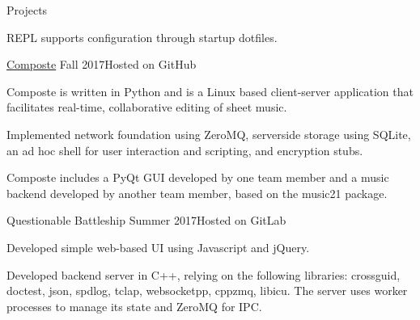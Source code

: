 \documentclass{resume} %
\begin{document}
\begin{rSection}{Projects}
\begin{rSubsection}
\item REPL supports configuration through startup dotfiles.

\end{rSubsection}

\begin{rSubsection}
    {\href{https://composte.me}{Composte}}
    {Fall 2017}{Hosted on GitHub}

\item Composte is written in Python and is a Linux based client-server
    application that facilitates real-time, collaborative editing of sheet
    music.

\item Implemented network foundation using ZeroMQ, serverside storage using
    SQLite, an ad hoc shell for user interaction and scripting, and encryption
    stubs.

\item Composte includes a PyQt GUI developed by one team member and a music
    backend developed by another team member, based on the music21 package.

\end{rSubsection}

\begin{rSubsection}
    {Questionable Battleship}
    {Summer 2017}{Hosted on GitLab}


\item Developed simple web-based UI using Javascript and jQuery.

\item Developed backend server in C++, relying on the following libraries:
    crossguid, doctest, json, spdlog, tclap, websocketpp, cppzmq,
    libicu. The server uses worker processes to manage its state and ZeroMQ
    for IPC.

\end{rSubsection}




\end{rSection}
\end{document}
